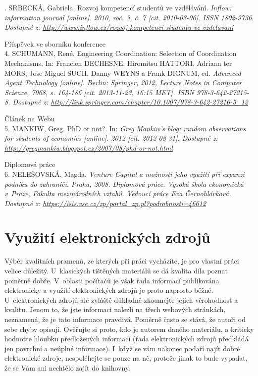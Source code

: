 . SRBECKÁ, Gabriela. Rozvoj kompetencí studentů ve vzdělávání. \it Inflow: information journal \rm [online]. 2010, roč. 3, č. 7 [cit. 2010-08-06]. ISSN 1802-9736. Dostupné z: \url{http://www.inflow.cz/rozvoj-kompetenci-studentu-ve-vzdelavani}

\bigskip
\noindent Příspěvek ve sborníku konference \\
4. SCHUMANN, René. Engineering Coordination: Selection of Coordination Mechanisms. In: Francien DECHESNE, Hiromitsu HATTORI, Adriaan ter MORS, Jose Miguel SUCH, Danny WEYNS a Frank DIGNUM, ed. \it Advanced Agent Technology \rm [online]. Berlin: Springer, 2012, Lecture Notes in Computer Science, 7068, s. 164-186 [cit. 2013-11-23, 16:15 MET]. ISBN 978-3-642-27215-8. Dostupné z: \url{http://link.springer.com/chapter/10.1007/978-3-642-27216-5\_12}

\bigskip
\noindent Článek na Webu \\
5. MANKIW, Greg. PhD or not?. In: \it Greg Mankiw's blog: random observations for students of economics \rm [online]. 2012 [cit. 2012-08-31]. Dostupné z: \url{http://gregmankiw.blogspot.cz/2007/08/phd-or-not.html}

\bigskip
\noindent Diplomová práce \\
6. NELEŠOVSKÁ, Magda. \it Venture Capital a možnosti jeho využití při expanzi podniku do zahraničí\rm . Praha, 2008. Diplomová práce. Vysoká škola ekonomická v~Praze, Fakulta mezinárodních vztahů. Vedoucí práce Eva Černohlávková. Dostupné z: \url{https://isis.vse.cz/zp/portal\_zp.pl?podrobnosti=46612}

\section{Využití elektronických zdrojů}

Výběr kvalitních pramenů, ze kterých při práci vycházíte, je pro vlastní práci velice důležitý. U~klasických tištěných materiálů se dá kvalita díla poznat poměrně dobře. V~oblasti počítačů je však řada informací publikována elektronicky a využití elektronických zdrojů je proto naprosto běžné. U~elektronických zdrojů ale zvláště důkladně zkoumejte jejich věrohodnost a kvalitu. Jenom to, že jste informaci nalezli na třech webových stránkách, neznamená, že je tato informace pravdivá. Poměrně často se stává, že autoři od sebe chyby opisují. Ověřujte si proto, kdo je autorem daného materiálu, a kriticky hodnoťte hloubku předložených informací (řada elektronických zdrojů předkládá jen povrchní a neúplné informace). I~když se vám nakonec podaří najít dobré elektronické zdroje, nespoléhejte se pouze na ně, protože jinak to bude vypadat, že se Vám ani nechtělo zajít do knihovny.

